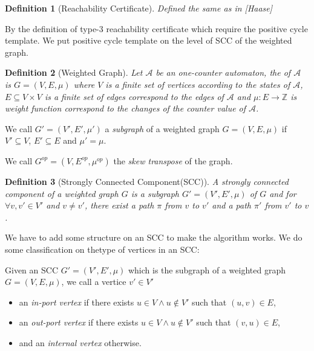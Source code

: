 \documentclass{article}
\newtheorem{definition}{Definition}
\begin{document}
\begin{definition}[Reachability Certificate]
Defined the same as in [Haase]
\end{definition}

By the definition of type-3 reachability certificate which require the positive cycle template. We put positive cycle template on the level of SCC of the weighted graph.


\begin{definition}[Weighted Graph]
Let $\mathcal{A}$ be an one-counter automaton, the  of $\mathcal{A}$ is $G = (V,E,\mu)$ where $V$ is a finite set of vertices according to the states of $\mathcal{A}$, $E\subseteq V\times V$ is a finite set of edges correspond to the edges of $\mathcal{A}$ and $\mu : E\rightarrow \mathbb{Z}$ is weight function correspond to the changes of the counter value of $\mathcal{A}$.
\end{definition}

We call $G' = (V', E', \mu')$ a \textit{subgraph} of a weighted graph $G = (V, E, \mu)$ if $V'\subseteq V$, $E'\subseteq E$ and $\mu' = \mu$.

We call $G^{op} = (V, E^{op}, \mu^{op})$ the \textit{skew transpose} of the graph.

\begin{definition}[Strongly Connected Component(SCC)]
A strongly connected component of a weighted graph $G$ is a subgraph $G' = (V', E', \mu)$ of $G$ and for $\forall v, v'\in V'$ and $v \ne v'$, there exist a path $\pi$ from $v$ to $v'$ and a path $\pi'$ from $v'$ to $v$.


\end{definition}

We have to add some  structure on an SCC to make the algorithm works. We do some classification on thetype of vertices in an SCC:

Given an SCC $G' = (V', E', \mu)$ which is the subgraph of a weighted graph $G = (V, E, \mu)$, we call a vertice $v'\in V'$ 

\begin{itemize}
\item an \textit{in-port vertex} if there exists $u \in V \wedge u \notin V'$ such that $(u,v) \in E$,
\item an \textit{out-port vertex} if there exists $u \in V \wedge u \notin V'$ such that $(v,u) \in E$,
\item and an \textit{internal vertex} otherwise.
\end{itemize}
\end{document}
